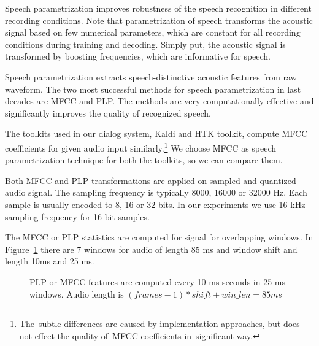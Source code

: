 Speech parametrization improves robustness of the speech recognition in different recording conditions.
Note that parametrization of speech transforms the acoustic signal based on few numerical parameters,
which are constant for all recording conditions during training and decoding.
Simply put, the acoustic signal is transformed by boosting frequencies, which are informative for speech.

Speech parametrization extracts speech-distinctive acoustic features from raw waveform.
The two most successful methods for speech parametrization in last decades are 
\ac{MFCC}\cite{davis1980comparison} and \ac{PLP}\cite{hermansky1990perceptual}.
The methods are very computationally effective and significantly improves the quality of recognized speech.


The toolkits used in our dialog system, Kaldi and \ac{HTK} toolkit,
compute \ac{MFCC} coefficients for given audio input similarly.\footnote{The~subtle differences are caused by implementation approaches, but does not effect the quality of~\ac{MFCC} coefficients in~significant way.}
We choose \ac{MFCC} as speech parametrization technique for both the toolkits,
so we can compare them.

Both \ac{MFCC} and \ac{PLP} transformations are applied on sampled and quantized audio signal.
The sampling frequency is typically 8000, 16000 or 32000 Hz.
Each sample is usually encoded to 8, 16 or 32 bits. 
In our experiments we use 16 kHz sampling frequency for 16 bit samples.  

The \ac{MFCC} or \ac{PLP} statistics are computed for signal for overlapping windows.
In Figure~\ref{fig:mfcc_window} there are 7 windows 
for audio of length 85 ms and window shift and length 10ms and 25 ms.

\begin{figure}[!htp]
    \begin{center}
    
    \caption{\ac{PLP} or \ac{MFCC} features are computed every 10 ms seconds in 25 ms windows.
    Audio length is $(frames-1)*shift + win\_len = 85ms$}
    \label{fig:mfcc_window} 
    \end{center}
\end{figure}


